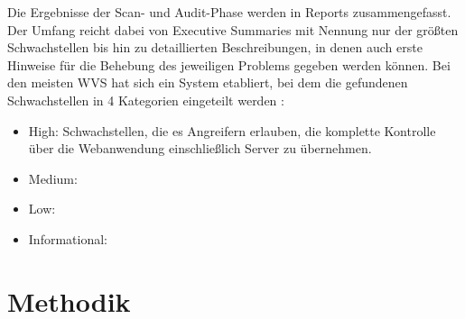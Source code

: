 \documentclass[12pt,oneside,a4paper,parskip]{scrbook}
\begin{document}
\begin{itemize}
    Die Ergebnisse der Scan- und Audit-Phase werden in Reports zusammengefasst. Der
    Umfang reicht dabei von Executive Summaries mit Nennung nur der größten Schwachstellen bis hin zu detaillierten Beschreibungen, in denen auch erste Hinweise für die Behebung des jeweiligen Problems gegeben werden können. Bei den meisten WVS hat sich ein System etabliert, bei dem die gefundenen Schwachstellen in 4 Kategorien eingeteilt werden \cite{Lepofsky}:
    \begin{itemize}
      \item High: Schwachstellen, die es Angreifern erlauben, die komplette Kontrolle über die Webanwendung einschließlich Server zu übernehmen. 
      \item Medium:
      \item Low:
      \item Informational:
    \end{itemize}

  \end{itemize}



\chapter{Methodik}
\end{document}

